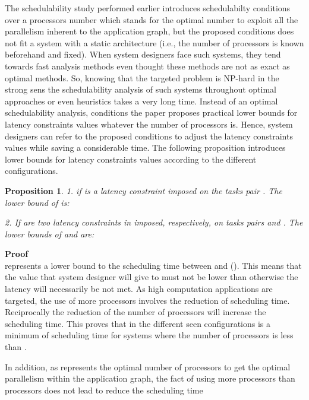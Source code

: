 \documentclass{ijcaArticle}
\newtheorem{Proposition}{Proposition}
\begin{document}
\vskip4mm
The schedulability study performed earlier introduces schedulabilty conditions over a processors number which stands for the optimal number to exploit all the parallelism inherent to the application graph, but the proposed conditions does not fit a system with a static architecture (i.e., the number of processors is known beforehand and fixed). When system designers face such systems, 
they tend towards fast analysis methods even thought these methods are not as exact as optimal methods. So, knowing that the targeted problem is NP-hard in the strong sens the schedulability analysis of such systems throughout optimal approaches or even heuristics takes a very long time.  Instead of an optimal schedulability analysis, conditions the paper proposes practical lower bounds for latency constraints values  whatever the number of processors is. Hence, system designers can refer to the proposed conditions 
to adjust the latency constraints values while saving a considerable time.  The following proposition introduces lower bounds for latency constraints values according to the different configurations.

 \begin{Proposition}\label{lower_bound}
1.  if  is a latency constraint imposed on the tasks pair . The lower bound of   is: 


2. If  are two latency constraints in  imposed, respectively, on tasks pairs  and . The lower bounds of   and  are:


 
\end{Proposition}
 
\textbf{Proof} \\
 represents a lower bound to the scheduling time between  and  (). This means that the value that system designer will give to  must not be lower than  otherwise the latency will necessarily be not met.  As high computation applications are targeted, the use of more processors involves the reduction of scheduling time. Reciprocally the reduction of the number of processors will increase the scheduling time. This proves that  in the different seen configurations is a minimum of scheduling time
for systems where the number of processors is less than . 

In addition, as  represents the optimal number of processors to get the optimal parallelism within the application graph, the fact of using more processors than  processors
does not lead to reduce the scheduling time
  
 
       
\end{document}
